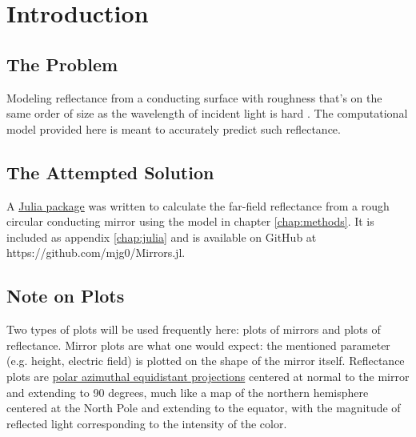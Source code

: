 \documentclass[etd,twoside,senior,noacknowledgments]{BYUPhys}
\begin{document}
\frontmatter

\makepreliminarypages

\tableofcontents

\mainmatter






\chapter{Introduction} \label{chap:intro}

\section{The Problem} \label{sec:problem}

Modeling reflectance from a conducting surface with roughness that's on the same order of size as the wavelength of incident light is hard \cite{Schroder2011}. The computational model provided here is meant to accurately predict such reflectance.



\section{The Attempted Solution} \label{sec:attempted_solution}

A \href{https://github.com/mjg0/Mirrors.jl}{Julia package} was written to calculate the far-field reflectance from a rough circular conducting mirror using the model in chapter \ref{chap:methods}. It is included as appendix \ref{chap:julia} and is available on GitHub at https://github.com/mjg0/Mirrors.jl.



\section{Note on Plots} \label{sec:plots_note}

Two types of plots will be used frequently here: plots of mirrors and plots of reflectance. Mirror plots are what one would expect: the mentioned parameter (e.g. height, electric field) is plotted on the shape of the mirror itself. Reflectance plots are \href{https://en.wikipedia.org/wiki/Azimuthal_equidistant_projection}{polar azimuthal equidistant projections} centered at normal to the mirror and extending to 90 degrees, much like a map of the northern hemisphere centered at the North Pole and extending to the equator, with the magnitude of reflected light corresponding to the intensity of the color.
\end{document}
